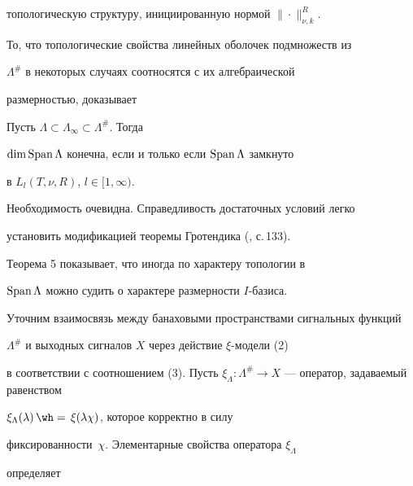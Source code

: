топологическую структуру, инициированную нормой $\|\cdot\|^R_{\nu,k}$. 


То, что топологические свойства линейных оболочек подмножеств из 


$\Lambda^{\#}$ в некоторых случаях соотносятся с их алгебраической 


размерностью, доказывает 


 


\begin{thm} 


Пусть $\Lambda\subset\Lambda_\infty\subset\Lambda^{\#}$. Тогда 


$\dim\operatorname{Span}\Lambda$ конечна, если и только если $\operatorname{Span}\Lambda$ замкнуто 


в $L_l(T,\nu,R)$, $l\in[1,\infty)$. 


\end{thm} 


 


Необходимость очевидна. Справедливость достаточных условий легко 


установить модификацией теоремы Гротендика (\cite{15}, с.\,133). 


 


Теорема 5 показывает, что иногда по характеру топологии в 


$\operatorname{Span}\Lambda$ можно судить о характере размерности $I$-базиса. 


 


Уточним взаимосвязь между банаховыми пространствами сигнальных функций 


$\Lambda^{\#}$ и выходных сигналов $X$ через действие $\xi$-модели (2) 


в соответствии с соотношением (3). Пусть $\xi_\Lambda:\Lambda^{\#}\to 


X$ --- оператор, задаваемый равенством 


$\xi_\Lambda(\lambda)\hateq\xi(\lambda\chi)$, которое корректно в силу 


фиксированности~$\chi$. Элементарные свойства оператора $\xi_\Lambda$ 


определяет 


 


